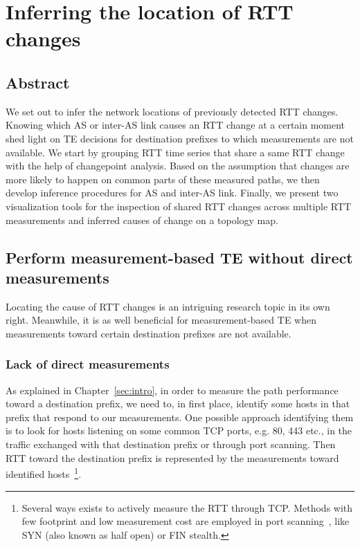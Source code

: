 \chapter{Inferring the location of RTT changes}
\label{sec:infer}
\section*{Abstract}
We set out to infer the network locations of previously detected RTT changes.
Knowing which AS or inter-AS link causes an RTT change at a certain moment shed light on TE decisions for destination prefixes to which measurements are not available.
We start by grouping RTT time series that share a same RTT change with the help of changepoint analysis.
Based on the assumption that changes are more likely to happen on common parts of these measured paths, we then develop inference procedures for AS and inter-AS link.
Finally, we present two visualization tools for the inspection of shared RTT changes across multiple RTT measurements and inferred causes of change on a topology map.
\clearpage

\section{Perform measurement-based TE without direct measurements}
Locating the cause of RTT changes is an intriguing research topic in its own right.
Meanwhile, it is as well beneficial for measurement-based TE when measurements toward certain destination prefixes are not available.

\subsection{Lack of direct measurements}
As explained in Chapter~\ref{sec:intro}, in order to measure the path performance toward a destination prefix, we need to, in first place, identify some hosts in that prefix that respond to our measurements.
One possible approach identifying them is to look for hosts listening on some common TCP ports, e.g. 80, 443 etc., in the traffic exchanged with that destination prefix or through port scanning.
Then RTT toward the destination prefix is represented by the measurements toward identified hosts~\footnote{Several ways exists to actively measure the RTT through TCP. Methods with few footprint and low measurement cost are employed in port scanning~\cite{nmap}, like SYN (also known as half open) or FIN stealth.}.


